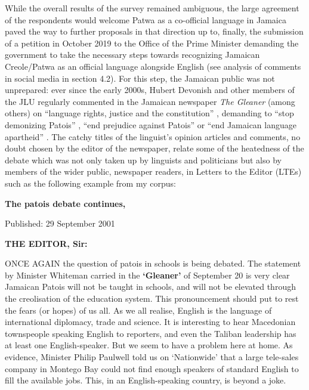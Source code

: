 \documentclass[output=paper,colorlinks,citecolor=brown]{langscibook}
\begin{document}
While the overall results of the survey remained ambiguous, the large agreement of the respondents would welcome Patwa as a co-official language in Jamaica paved the way to further proposals in that direction up to, finally, the submission of a petition in October 2019 to the Office of the Prime Minister demanding the government to take the necessary steps towards recognizing Jamaican Creole/Patwa as an official language alongside English (see analysis of comments in social media in section 4.2). For this step, the Jamaican public was not unprepared: ever since the early 2000s, Hubert Devonish and other members of the JLU regularly commented in the Jamaican newspaper \textit{The Gleaner} (among others) on “language rights, justice and the constitution” \citep{devonish2002language}, demanding to “stop demonizing Patois” \citep{devonish2012stop}, “end prejudice against Patois” \citep{devonish2016end} or “end Jamaican language apartheid” \citep{devonish2018end}. The catchy titles of the linguist’s opinion articles and comments, no doubt chosen by the editor of the newspaper, relate some of the heatedness of the debate which was not only taken up by linguists and politicians but also by members of the wider public, newspaper readers, in Letters to the Editor (LTEs) such as the following example from my corpus:


\ea
\textbf{The patois debate continues, }

Published:  29 September 2001


\textbf{THE EDITOR, Sir:}

ONCE AGAIN the question of patois in schools is being debated. The statement by Minister Whiteman carried in the \textbf{`Gleaner'} of September 20 is very clear Jamaican Patois will not be taught in schools, and will not be elevated through the creolisation of the education system. This pronouncement should put to rest the fears (or hopes) of us all. As we all realise, English is the language of international diplomacy, trade and science. It is interesting to hear Macedonian townspeople speaking English to reporters, and even the Taliban leadership has at least one English-speaker. But we seem to have a problem here at home. As evidence, Minister Philip Paulwell told us on `Nationwide' that a large tele-sales company in Montego Bay could not find enough speakers of standard English to fill the available jobs. This, in an English-speaking country, is beyond a joke.
\end{document}
